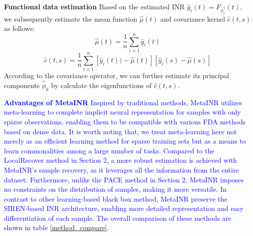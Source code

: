 \documentclass{article}
\begin{document}
\textbf{Functional data estimation}
Based on the estimated INR $\hat{y}_i(t)=F_{\phi^*_i}(t)$, we subsequently estimate the mean function $\hat{\mu}(t)$ and covariance kernel $\hat{c}(t,s)$ as follows:
$$
\hat{\mu}(t)= \frac{1}{n} \sum_{i=1}^n \hat{y}_i(t)
$$
$$
\hat{c}(t,s)= \frac{1}{n} \sum_{i=1}^n  [\hat{y}_i(t))-\hat{\mu}(t)] [\hat{y}_i(s)-\hat{\mu}(s) ]
$$
According to the covariance operator, we can further estimate its principal components $\hat{\phi}_k$ by calculate the eigenfunctions of $\hat{c}(t,s)$.

\textcolor{blue}{
\textbf{Advantages of MetaINR}
Inspired by traditional methods, MetaINR utilizes meta-learning to complete implicit neural representation for samples with only sparse observations, 
enabling them to be compatible with various FDA methods based on dense data.
It is worth noting that, we treat meta-learning here not merely as an efficient learning method for sparse training sets but as a means to learn commonalities among a large number of tasks.
Compared to the LocalRecover method in Section 2, a more robust estimation is achieved with MetaINR's sample recovery, as it leverages all the information from the entire dataset. 
Furthermore, unlike the PACE method in Section 2, 
MetaINR imposes no constraints on the distribution of samples, making it more versatile.
In contrast to other learning-based black box method, MetaINR preserve the SIREN-based INR architecture, enabling more detailed representation and easy differentiation of each sample.
The overall comparison of these methods are shown in table \ref{method_compare}.
}
\end{document}
